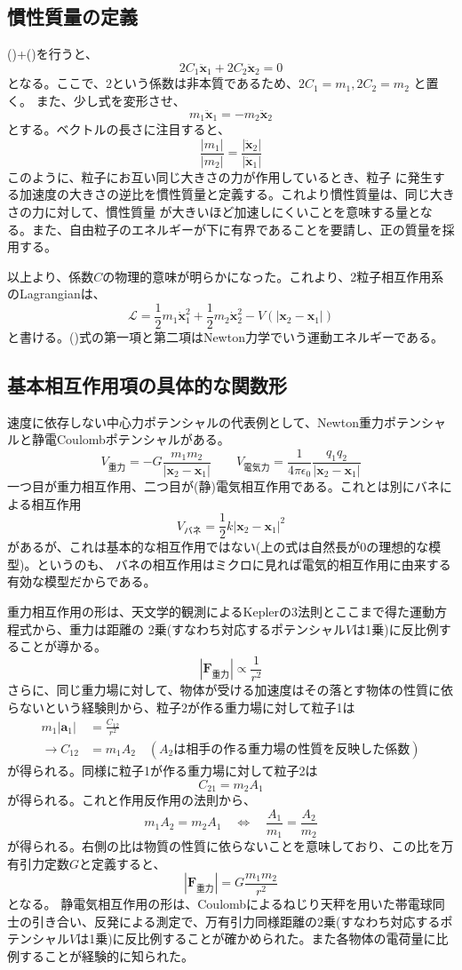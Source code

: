 \documentclass[a4paper,11pt]{ltjsarticle}
\newcommand{\La}{\mathcal{L}}
\begin{document}
\subsection{慣性質量の定義}
\label{sec:mass}
()+()を行うと、
\[
2C_1\ddot{\bm{x}}_1+2C_2\ddot{\bm{x}}_2=0
\]
となる。ここで、2という係数は非本質であるため、$2C_1=m_1,2C_2=m_2$ と置く。
また、少し式を変形させ、
\[
m_1\ddot{\bm{x}}_1=-m_2\ddot{\bm{x}}_2
\]
とする。ベクトルの長さに注目すると、
\[
\frac{|m_1|}{|m_2|}=\frac{|\ddot{\bm{x}}_2|}{|\ddot{\bm{x}}_1|}
\]
このように、粒子にお互い同じ大きさの力が作用しているとき、粒子
に発生する加速度の大きさの逆比を慣性質量と定義する。これより慣性質量は、同じ大きさの力に対して、慣性質量
が大きいほど加速しにくいことを意味する量となる。また、自由粒子のエネルギーが下に有界であることを要請し、正の質量を採用する。

以上より、係数$C$の物理的意味が明らかになった。これより、2粒子相互作用系のLagrangianは、
\begin{equation}
\La=\frac{1}{2}m_1\dot{\bm{x}}_1^2+\frac{1}{2}m_2\dot{\bm{x}}_2^2-V(|\bm{x}_2-\bm{x}_1|)
\label{eq:Lagrangian!}
\end{equation}
と書ける。()式の第一項と第二項はNewton力学でいう運動エネルギーである。

\subsection{基本相互作用項の具体的な関数形}
速度に依存しない中心力ポテンシャルの代表例として、Newton重力ポテンシャルと静電Coulombポテンシャルがある。
\[
V_{重力}=-G\frac{m_1m_2}{|\bm{x}_2-\bm{x}_1|} \qquad V_{電気力}=\frac{1}{4\pi\epsilon_0}\frac{q_1q_2}{|\bm{x}_2-\bm{x}_1|}
\]
一つ目が重力相互作用、二つ目が(静)電気相互作用である。これとは別にバネによる相互作用
\[
V_{バネ}=\frac{1}{2}k|\bm{x}_2-\bm{x}_1|^2
\]
があるが、これは基本的な相互作用ではない(上の式は自然長が0の理想的な模型)。というのも、
バネの相互作用はミクロに見れば電気的相互作用に由来する有効な模型だからである。

重力相互作用の形は、天文学的観測によるKeplerの3法則とここまで得た運動方程式から、重力は距離の
2乗(すなわち対応するポテンシャル$V$は1乗)に反比例することが導かる。
\[
|\bm{F}_{\text{重力}}| \propto \frac{1}{r^2}
\]
さらに、同じ重力場に対して、物体が受ける加速度はその落とす物体の性質に依らないという経験則から、粒子2が作る重力場に対して粒子1は
\begin{align*}
m_1|\bm{a}_1|&=\frac{C_{12}}{r^2}
\\
\rightarrow C_{12}&=m_1A_2 \quad (A_2 は相手の作る重力場の性質を反映した係数)
\end{align*}
が得られる。同様に粒子1が作る重力場に対して粒子2は
\[
C_{21}=m_2A_1
\]
が得られる。これと作用反作用の法則から、
\[
m_1A_2=m_2A_1 \quad \Leftrightarrow\quad \frac{A_1}{m_1}=\frac{A_2}{m_2} 
\]
が得られる。右側の比は物質の性質に依らないことを意味しており、この比を万有引力定数$G$と定義すると、
\[
|\bm{F}_{重力}|=G\frac{m_1m_2}{r^2}
\]
となる。
静電気相互作用の形は、Coulombによるねじり天秤を用いた帯電球同士の引き合い、反発による測定で、万有引力同様距離の2乗(すなわち対応するポテンシャル$V$は1乗)に反比例することが確かめられた。また各物体の電荷量に比例することが経験的に知られた。
\end{document}
